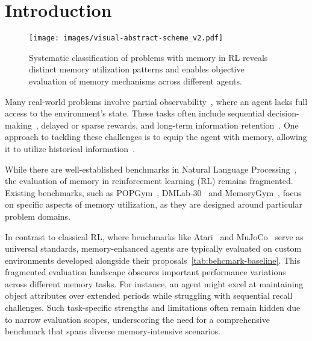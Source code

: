 \section{Introduction}
\label{sec:introduction}

\begin{wrapfigure}{r}{0.5\textwidth}
    \vspace{-25pt}
    \centering
    \texttt{[image: images/visual-abstract-scheme\_v2.pdf]}
    \vspace{-15pt}
    \caption{Systematic classification of problems with memory in RL reveals distinct memory utilization patterns and enables objective evaluation of memory mechanisms across different agents.}
    \label{fig:visualiabstract}
    \vspace{-15pt}
\end{wrapfigure}
Many real-world problems involve partial observability~\citep{KAELBLING199899}, where an agent lacks full access to the environment’s state. 
These tasks often include sequential decision-making~\citep{chen2021decision}, delayed or sparse rewards, and long-term information retention~\citep{gtrxl,hcam}. One approach to tackling these challenges is to equip the agent with memory, allowing it to utilize historical information~\citep{meng2021memory,ni2021recurrent}.

While there are well-established benchmarks in Natural Language Processing~\citep{bai2023longbench,an2023eval}, the evaluation of memory in reinforcement learning (RL) remains fragmented. Existing benchmarks, such as POPGym~\citep{popgym2023}, DMLab-30~\citep{dmlab} and MemoryGym~\citep{pleines2023memory}, focus on specific aspects of memory utilization, as they are designed around particular problem domains. 

In contrast to classical RL, where benchmarks like Atari~\citep{atari} and MuJoCo~\citep{mujoco} serve as universal standards, memory-enhanced agents are typically evaluated on custom environments developed alongside their proposals~\autoref{tab:behcmark-baseline}. This fragmented evaluation landscape obscures important performance variations across different memory tasks. For instance, an agent might excel at maintaining object attributes over extended periods while struggling with sequential recall challenges. Such task-specific strengths and limitations often remain hidden due to narrow evaluation scopes, underscoring the need for a comprehensive benchmark that spans diverse memory-intensive scenarios.

